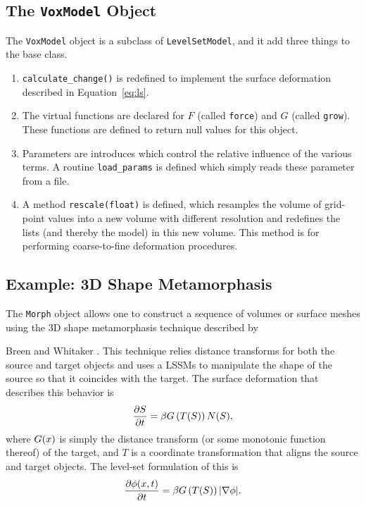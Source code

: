 \subsection{The {\tt VoxModel} Object}

The {\tt VoxModel} object is a subclass of {\tt LevelSetModel}, and
it add three things to the base class.

\begin{enumerate}
\item {\tt calculate\_change()} is redefined to implement the surface
deformation described in Equation~\ref{eq:ls}.
\item The virtual functions are declared for $F$ (called
{\tt force}) and $G$ (called {\tt grow}).  These functions are
defined to return null values for this object.
\item Parameters are introduces which control the relative influence
of the various terms.  A routine {\tt load\_params} is defined which
simply reads these parameter from a file.
\item A method {\tt rescale(float)} is defined, which resamples the
volume of grid-point values into a new volume with different
resolution and redefines the lists (and thereby the
model) in this new volume.  This method is for performing
coarse-to-fine deformation procedures.
\end{enumerate}

\subsection{Example: 3D Shape Metamorphasis}
The {\tt Morph} object allows one to construct a sequence of volumes
or surface meshes using the 3D shape metamorphasis technique described by

Breen and Whitaker \cite{}.  This technique relies distance transforms
for both the source and target objects and uses a LSSMs to manipulate
the shape of the source so that it coincides with the target.  The
surface deformation that describes this behavior is
\begin{equation}
\frac{\partial {\boldmath S}}{\partial t}
= \beta G
\left(
T({\boldmath S})
\right)
{\boldmath N}({\boldmath S}),
\end{equation}
where $G({\boldmath x})$ is simply the distance transform (or some monotonic
function thereof) of the target, and $T$ is a coordinate
transformation that aligns the source and target objects.
The level-set formulation of this is
\begin{equation}
\frac{\partial \phi({\boldmath x}, t)}{\partial t}
= \beta G \left( T({\boldmath S}) \right) |\nabla \phi|.
\label{eq:ls2}
\end{equation}

